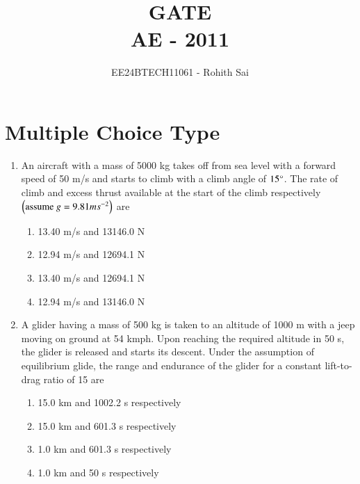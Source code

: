 \documentclass[journal]{IEEEtran}
\begin{document}

\vspace{3cm}

\title{GATE\\AE - 2011}
\author{EE24BTECH11061 - Rohith Sai}
\maketitle

\renewcommand{\thefigure}{\theenumi}
\renewcommand{\thetable}{\theenumi}

\section*{Multiple Choice Type}
\begin{enumerate}
\item An aircraft with a mass of 5000 kg takes off from sea level with a forward speed of 50 m/s and starts to climb with a climb angle of $15 \degree$. The rate of climb and excess thrust available at the start of the climb respectively $\left(\text{assume }g = 9.81 ms^{-2}\right)$ are
\begin{multicols}{2}
    \begin{enumerate}
        \item 13.40 m/s and 13146.0 N
        \item 12.94 m/s and 12694.1 N
        \item 13.40 m/s and 12694.1 N
        \item 12.94 m/s and 13146.0 N
    \end{enumerate}
\end{multicols}

\item A glider having a mass of 500 kg is taken to an altitude of 1000 m with a jeep moving on ground at 54 kmph. Upon reaching the required altitude in 50 s, the glider is released and starts its descent. Under the assumption of equilibrium glide, the range and endurance of the glider for a constant lift-to-drag ratio of 15 are
\begin{multicols}{2}
    \begin{enumerate}
        \item 15.0 km and 1002.2 s respectively
        \item 15.0 km and 601.3 s respectively
        \item 1.0 km and 601.3 s respectively
        \item 1.0 km and 50 s respectively
    \end{enumerate}
\end{multicols}
    

\end{enumerate}
\end{document}
